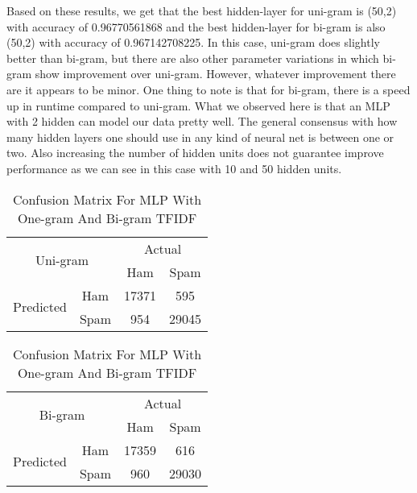 Based on these results, we get that the best hidden-layer for uni-gram is (50,2) with accuracy of 0.96770561868 and the best hidden-layer for bi-gram is also (50,2) with accuracy of 0.967142708225. In this case, uni-gram does slightly better than bi-gram, but there are also other parameter variations in which bi-gram show improvement over uni-gram. However, whatever improvement there are it appears to be minor. One thing to note is that for bi-gram, there is a speed up in runtime compared to  uni-gram. What we observed here is that an MLP with 2 hidden can model our data pretty well. The general consensus with how many hidden layers one should use in any kind of neural net is between one or two. Also increasing the number of hidden units does not guarantee improve performance as we can see in this case with 10 and 50 hidden units. 

\begin{table}[H]
\centering
\begin{subtable}{.5\textwidth}
\centering
\begin{tabular}{@{}|c|c|c|c|@{}}
\toprule
\multicolumn{2}{|c|}{\multirow{2}{*}{Uni-gram}} & \multicolumn{2}{c|}{Actual} \\ \cmidrule(l){3-4} 
\multicolumn{2}{|c|}{}                        & Ham          & Spam         \\ \midrule
\multirow{2}{*}{Predicted}       & Ham        & 17371        & 595 \\ \cmidrule(l){2-4} 
                                 & Spam       & 954         & 29045        \\ \bottomrule
\end{tabular}

\begin{tabular}{@{}|c|c|c|c|@{}}
\toprule
\multicolumn{2}{|c|}{\multirow{2}{*}{Bi-gram}} & \multicolumn{2}{c|}{Actual} \\ \cmidrule(l){3-4} 
\multicolumn{2}{|c|}{}                        & Ham          & Spam         \\ \midrule
\multirow{2}{*}{Predicted}       & Ham        & 17359   	  & 616 \\ \cmidrule(l){2-4} 
                                 & Spam       & 960 		  & 29030 \\ \bottomrule
\end{tabular}
\end{subtable}
\caption{Confusion Matrix For MLP With One-gram And Bi-gram TFIDF}
\label{Confusion_MLP}
\end{table}



